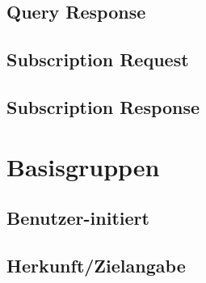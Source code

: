 \subsection*{Query Response}



\subsection*{Subscription Request}



\subsection*{Subscription Response}



\section{Basisgruppen}
\label{sec:Nachrichten:Basisgruppen}

\subsection*{Benutzer-initiert}





\subsection*{Herkunft/Zielangabe}



